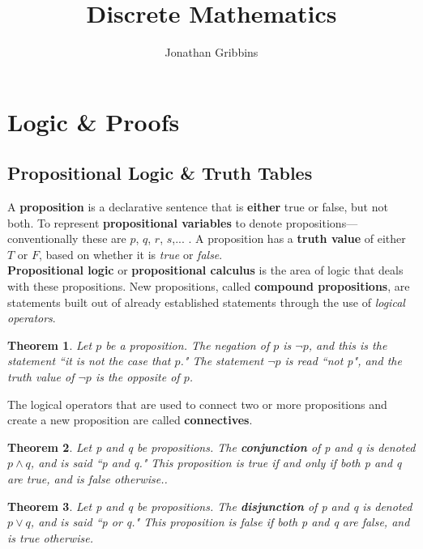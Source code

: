 \documentclass[12pt,letterpaper]{article}
\author{Jonathan Gribbins}
\title{Discrete Mathematics}
\date{}
\newtheorem{theorem}{Theorem}
\begin{document}
\maketitle

\tableofcontents

\pagebreak

\section{Logic \& Proofs}

\subsection{Propositional Logic \& Truth Tables}

A \textbf{proposition} is a declarative sentence that is \textbf{either} true or false, but not both. To represent \textbf{propositional variables} to denote propositions---conventionally these are $p$, $q$, $r$, $s$,... . A proposition has a \textbf{truth value} of either $T$ or $F$, based on whether it is \textit{true} or \textit{false}. \\

\textbf{Propositional logic} or \textbf{propositional calculus} is the area of logic that deals with these propositions. New propositions, called \textbf{compound propositions}, are statements built out of already established statements through the use of \textit{logical operators}.

\begin{theorem}
	Let $p$ be a proposition. The negation of $p$ is $\lnot p$, and this is the statement ``it is not the case that $p$." The statement $\lnot p$ is read ``not p", and the truth value of $\lnot p$ is the opposite of $p$.
\end{theorem}

The logical operators that are used to connect two or more propositions and create a new proposition are called \textbf{connectives}. 

\begin{theorem}
	Let p and q be propositions. The \textbf{conjunction} of p and q is denoted $p\wedge q$, and is said ``p and q." This proposition is true if and only if both p and q are true, and is false otherwise..
\end{theorem}

\begin{theorem}
	Let p and q be propositions. The \textbf{disjunction} of p and q is denoted $p\vee q$, and is said ``p or q." This proposition is false if both p and q are false, and is true otherwise.
\end{theorem}
\end{document}
